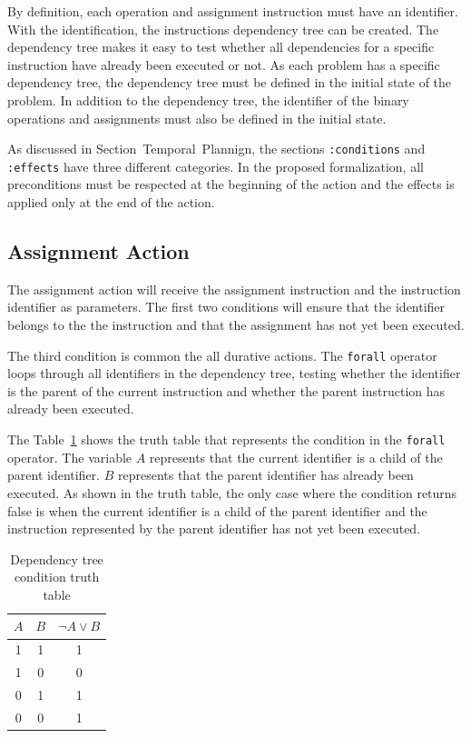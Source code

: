 \documentclass[letterpaper]{article}
\begin{document}
By definition, each operation and assignment instruction must have an identifier. With the identification, the instructions dependency tree can be created. The dependency tree makes it easy to test whether all dependencies for a specific instruction have already been executed or not. As each problem has a specific dependency tree, the dependency tree must be defined in the initial state of the problem. In addition to the dependency tree, the identifier of the binary operations and assignments must also be defined in the initial state.

As discussed in Section~Temporal~Plannign, the sections \texttt{:conditions} and \texttt{:effects} have three different categories. In the proposed formalization, all preconditions must be respected at the beginning of the action and the effects is applied only at the end of the action.

\subsection{Assignment Action}

The assignment action will receive the assignment instruction and the instruction identifier as parameters. The first two conditions will ensure that the identifier belongs to the the instruction and that the assignment has not yet been executed.

The third condition is common the all durative actions. The \texttt{forall} operator loops through all identifiers in the dependency tree, testing whether the identifier is the parent of the current instruction and whether the parent instruction has already been executed.

The Table~\ref{table:forall-truth-table} shows the truth table that represents the condition in the \texttt{forall} operator. The variable $A$ represents that the current identifier is a child of the parent identifier. $B$ represents that the parent identifier has already been executed. As shown in the truth table, the only case where the condition returns false is when the current identifier is a child of the parent identifier and the instruction represented by the parent identifier has not yet been executed.

\begin{table}[h]
    \centering
    \begin{tabular}{|c|c|c|}
        \hline
        $A$ & $B$ & $\neg A \lor B$ \\
        \hline
        1   & 1   & 1               \\
        1   & 0   & 0               \\
        0   & 1   & 1               \\
        0   & 0   & 1               \\
        \hline
    \end{tabular}
    \caption{Dependency tree condition truth table}
    \label{table:forall-truth-table}
\end{table}
\end{document}
